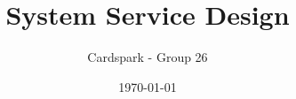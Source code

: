 \documentclass{article}
\begin{document}
\title{System Service Design}

\author{Cardspark - Group 26}

\date{\today}

\maketitle  
\end{document}
